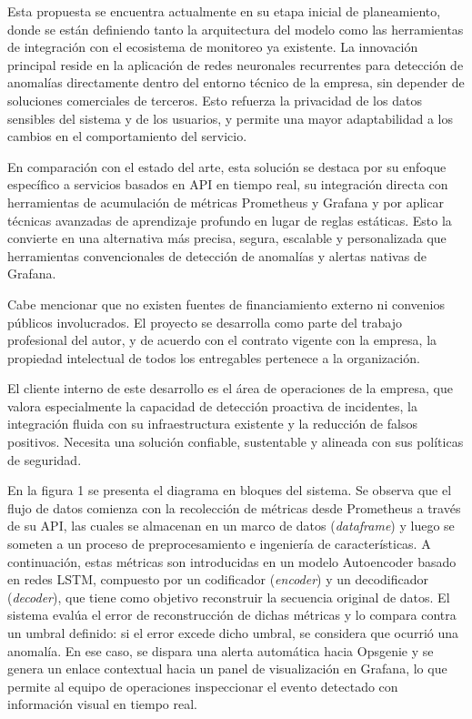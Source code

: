 \documentclass[
11pt, %
]{charter}
\begin{document}
Esta propuesta se encuentra actualmente en su etapa inicial de planeamiento, donde se están definiendo tanto la arquitectura del modelo como las herramientas de integración con el ecosistema de monitoreo ya existente. La innovación principal reside en la aplicación de redes neuronales recurrentes para detección de anomalías directamente dentro del entorno técnico de la empresa, sin depender de soluciones comerciales de terceros. Esto refuerza la privacidad de los datos sensibles del sistema y de los usuarios, y permite una mayor adaptabilidad a los cambios en el comportamiento del servicio.

En comparación con el estado del arte, esta solución se destaca por su enfoque específico a servicios basados en API en tiempo real, su integración directa con herramientas de acumulación de métricas Prometheus y Grafana y por aplicar técnicas avanzadas de aprendizaje profundo en lugar de reglas estáticas. Esto la convierte en una alternativa más precisa, segura, escalable y personalizada que herramientas convencionales de detección de anomalías y alertas nativas de Grafana.

Cabe mencionar que no existen fuentes de financiamiento externo ni convenios públicos involucrados. El proyecto se desarrolla como parte del trabajo profesional del autor, y de acuerdo con el contrato vigente con la empresa, la propiedad intelectual de todos los entregables pertenece a la organización.

El cliente interno de este desarrollo es el área de operaciones de la empresa, que valora especialmente la capacidad de detección proactiva de incidentes, la integración fluida con su infraestructura existente y la reducción de falsos positivos. Necesita una solución confiable, sustentable y alineada con sus políticas de seguridad.

En la figura 1 se presenta el diagrama en bloques del sistema. Se observa que el flujo de datos comienza con la recolección de métricas desde Prometheus a través de su API, las cuales se almacenan en un marco de datos (\textit{dataframe}) y luego se someten a un proceso de preprocesamiento e ingeniería de características. A continuación, estas métricas son introducidas en un modelo Autoencoder basado en redes LSTM, compuesto por un codificador (\textit{encoder}) y un decodificador (\textit{decoder}), que tiene como objetivo reconstruir la secuencia original de datos. El sistema evalúa el error de reconstrucción de dichas métricas y lo compara contra un umbral definido: si el error excede dicho umbral, se considera que ocurrió una anomalía. En ese caso, se dispara una alerta automática hacia Opsgenie y se genera un enlace contextual hacia un panel de visualización en Grafana, lo que permite al equipo de operaciones inspeccionar el evento detectado con información visual en tiempo real. 
\end{document}
